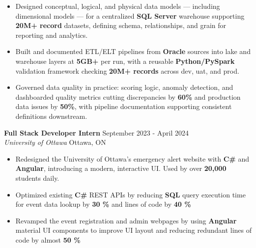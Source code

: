 \documentclass[a4paper]{article}
\begin{document}
\begin{itemize}
\item Designed conceptual, logical, and physical data models — including dimensional models — for a centralized \textbf{SQL Server} warehouse supporting \textbf{20M+ record} datasets, defining schema, relationships, and grain for reporting and analytics.

\item Built and documented ETL/ELT pipelines from \textbf{Oracle} sources into lake and warehouse layers at \textbf{5GB+} per run, with a reusable \textbf{Python/PySpark} validation framework checking \textbf{20M+ records} across dev, uat, and prod.

\item Governed data quality in practice: scoring logic, anomaly detection, and dashboarded quality metrics cutting discrepancies by \textbf{60\%} and production data issues by \textbf{50\%}, with pipeline documentation supporting consistent definitions downstream.

\end{itemize}

\textbf{Full Stack Developer Intern } \hfill September 2023 - April 2024\\
\textit{University of Ottawa} \hfill Ottawa, ON\\
\vspace{-2mm}
\begin{itemize} \itemsep -4pt
    \item Redesigned the University of Ottawa's emergency alert website with \textbf{C\#} and \textbf{Angular}, introducing a modern, interactive UI. Used by over \textbf{20,000} students daily.
     \item Optimized existing \textbf{C\#} REST APIs by reducing \textbf{SQL} query execution time for event data lookup by \textbf{30 \%} and lines of code by \textbf{40 \%}
    \item Revamped the event registration and admin webpages by using \textbf{Angular} material UI components to improve UI layout and reducing redundant lines of code by almost \textbf{50 \%}
\end{itemize}
\end{document}
